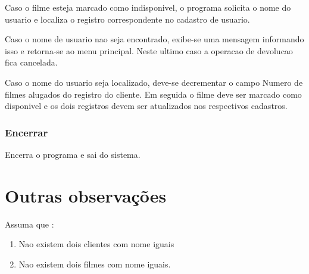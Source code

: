 \documentclass[a4paper,11pt]{article}
\begin{document}
Caso o filme esteja marcado como indisponivel, o programa solicita o nome do
usuario e localiza o registro correspondente no cadastro de usuario.

Caso o nome de usuario nao seja encontrado, exibe-se uma mensagem informando
isso e retorna-se ao menu principal. Neste ultimo caso a operacao de devolucao
fica cancelada.

Caso o nome do usuario seja localizado, deve-se decrementar o campo Numero de
filmes alugados do registro do cliente. Em seguida o filme deve ser marcado como
disponivel e os dois registros devem ser atualizados nos respectivos cadastros.

\subsubsection{Encerrar}

Encerra o programa e sai do sistema.

\section{Outras observações}

Assuma que :

\begin{enumerate}
\item Nao existem dois clientes com nome iguais
\item Nao existem dois filmes com nome iguais.
\end{enumerate}




\end{document}
